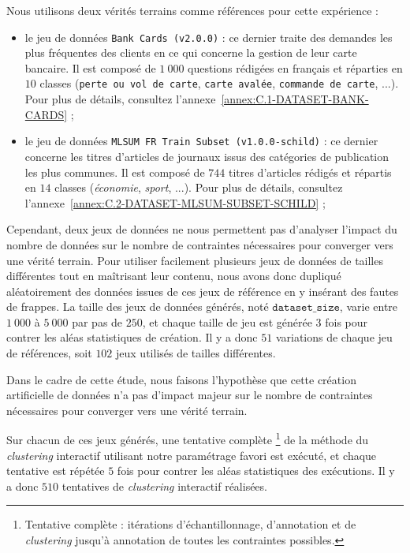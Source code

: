 			Nous utilisons deux vérités terrains comme références pour cette expérience :
			\begin{itemize}
				\item le jeu de données \texttt{Bank Cards (v2.0.0)} : ce dernier traite des demandes les plus fréquentes des clients en ce qui concerne la gestion de leur carte bancaire. Il est composé de $1~000$ questions rédigées en français et réparties en $10$ classes (\texttt{perte ou vol de carte}, \texttt{carte avalée}, \texttt{commande de carte}, ...). Pour plus de détails, consultez l'annexe~\ref{annex:C.1-DATASET-BANK-CARDS} ;
				\item le jeu de données \texttt{MLSUM FR Train Subset (v1.0.0-schild)} : ce dernier concerne les titres d'articles de journaux issus des catégories de publication les plus communes. Il est composé de $744$  titres d'articles rédigés et répartis en $14$ classes (\textit{économie}, \textit{sport}, ...). Pour plus de détails, consultez l'annexe~\ref{annex:C.2-DATASET-MLSUM-SUBSET-SCHILD} ;
			\end{itemize}

			Cependant, deux jeux de données ne nous permettent pas d'analyser l'impact du nombre de données sur le nombre de contraintes nécessaires pour converger vers une vérité terrain.
			Pour utiliser facilement plusieurs jeux de données de tailles différentes tout en maîtrisant leur contenu, nous avons donc dupliqué aléatoirement des données issues de ces jeux de référence en y insérant des fautes de frappes.
			La taille des jeux de données générés, noté $\texttt{dataset\_size}$, varie entre $1~000$ à $5~000$ par pas de $250$, et chaque taille de jeu est générée $3$ fois pour contrer les aléas statistiques de création.
			Il y a donc $51$ variations de chaque jeu de références, soit $102$ jeux utilisés de tailles différentes.
			
			\begin{leftBarWarning}
				Dans le cadre de cette étude, nous faisons l'hypothèse que cette création artificielle de données n'a pas d'impact majeur sur le nombre de contraintes nécessaires pour converger vers une vérité terrain.
			\end{leftBarWarning}
			
			Sur chacun de ces jeux générés, une tentative complète
			\footnote{Tentative complète : itérations d'échantillonnage, d'annotation et de \textit{clustering} jusqu'à annotation de toutes les contraintes possibles.}
			de la méthode du \textit{clustering} interactif utilisant notre paramétrage favori est exécuté, et chaque tentative est répétée $5$ fois pour contrer les aléas statistiques des exécutions.
			Il y a donc $510$ tentatives de \textit{clustering} interactif réalisées.
			
